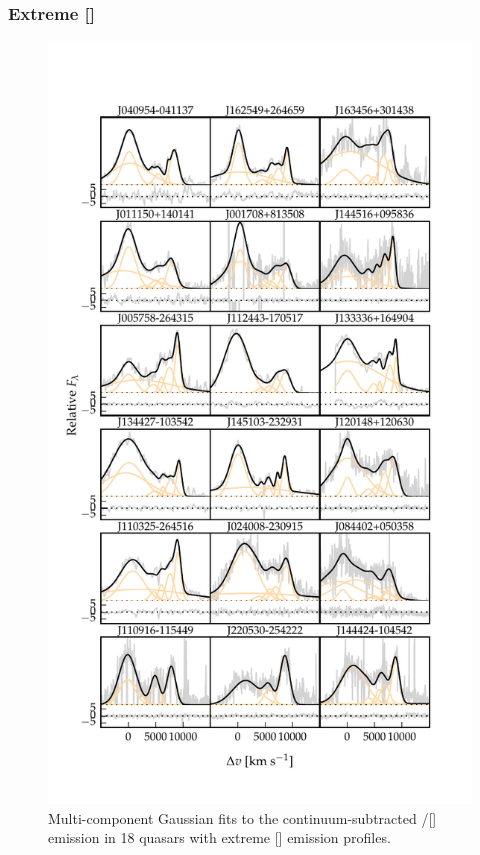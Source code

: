 \subsubsection{Extreme []}

\begin{figure}
    \centering
    \includegraphics[width=1\columnwidth]{figures/chapter04/example_spectrum_grid_extreme_oiii.pdf} 
    \caption{Multi-component Gaussian fits to the continuum-subtracted \hbns/[] emission in 18 quasars with extreme [] emission profiles.}     
    \label{fig:example_spectrum_grid_extreme_oiii}
\end{figure}

